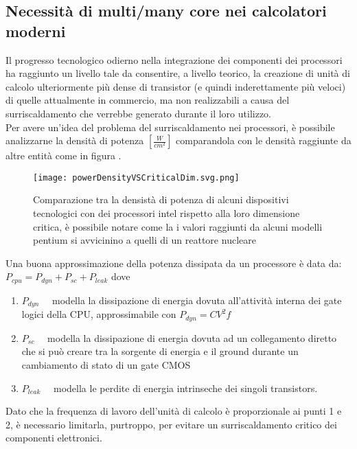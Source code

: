 \subsection{Necessità di multi/many core nei calcolatori moderni}
Il progresso tecnologico odierno nella integrazione dei componenti dei processori
ha raggiunto un livello tale da consentire, a livello teorico, la creazione di unità di calcolo 
ulteriormente più dense di transistor (e quindi inderettamente più veloci) di quelle attualmente in commercio,
ma non realizzabili a causa del surriscaldamento che verrebbe generato durante il loro utilizzo.\\
Per avere un'idea del problema del surriscaldamento nei processori,
è possibile analizzarne la densità di potenza $\left[\frac{W}{cm^2}\right]$
comparandola con le densità raggiunte da altre entità come in figura .
\begin{figure}[H]
  \centering \texttt{[image: powerDensityVSCriticalDim.svg.png]}
  \caption[densità di potenza CPU vs dimensione critica]{Comparazione tra la densistà di potenza di alcuni dispositivi tecnologici con dei processori intel rispetto alla loro dimensione critica,
			è possibile notare come la i valori raggiunti da alcuni modelli pentium si avvicinino a quelli di un reattore nucleare}
  \decoRule \label{fig:powerDensityVSCriticalDim}
\end{figure}
\voidLine
Una buona approssimazione della potenza dissipata da un processore è data da:\\
$P_{cpu} =  P_{dyn} + P_{sc} + P_{leak}$ dove 
\begin{enumerate}
	\item $P_{dyn}\quad$ modella la dissipazione di energia dovuta all'attività interna dei gate logici della CPU,
	approssimabile con $P_{dyn} = CV^2 f$
	\item $P_{sc}\quad$	 modella la dissipazione di energia 
	dovuta ad un collegamento diretto che si può creare tra la sorgente di energia e il ground durante
	un cambiamento di stato di un gate CMOS
	\item $P_{leak}\quad$ modella le perdite di energia intrinseche dei singoli transistors.
\end{enumerate}
Dato che la frequenza di lavoro dell'unità di calcolo è proporzionale ai punti 1 e 2,
è necessario limitarla, purtroppo, per evitare un surriscaldamento critico dei componenti elettronici.\\
